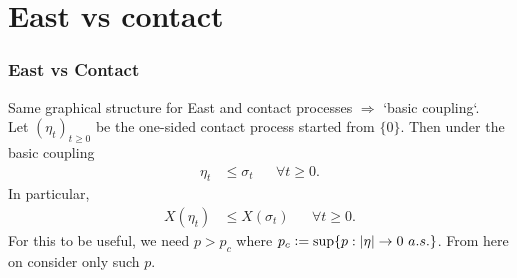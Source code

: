 \documentclass{beamer}
\newcommand{\defeq}{\vcentcolon=}
\begin{document}
\section{East vs contact}
\begin{frame}
\frametitle{East vs Contact}
\pause
Same graphical structure for East and contact processes $\Rightarrow$ `basic coupling`. \\
\pause
Let $(\eta_t)_{t \geq 0}$ be the one-sided contact process started from $\{0\}$. Then under the basic coupling
\begin{align*}
\eta_{t} &\leq \sigma_{t} &&\forall t \geq 0. 
\end{align*}
\pause
In particular, 
\begin{align*}
X(\eta_{t}) &\leq X(\sigma_{t}) &&\forall t \geq 0. 
\end{align*}
\pause
For this to be useful, we need $p > p_c$ where $p_c \defeq \sup\{ p : |\eta| \rightarrow 0\ a.s.\}$. From here on consider only such $p$. 
\end{frame}
\end{document}
